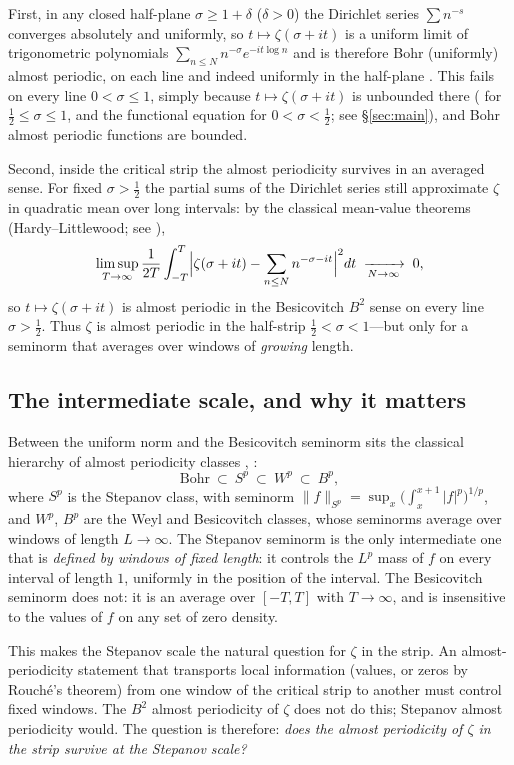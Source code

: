 \documentclass[11pt]{amsart}
\theoremstyle{definition}
\theoremstyle{remark}
\begin{document}
First, in any closed half-plane $\sigma\geq1+\delta$ ($\delta>0$) the
Dirichlet series $\sum n^{-s}$ converges absolutely and uniformly, so
$t\mapsto\zeta(\sigma+it)$ is a uniform limit of trigonometric
polynomials $\sum_{n\leq N}n^{-\sigma}e^{-it\log n}$ and is therefore
Bohr (uniformly) almost periodic, on each line and indeed uniformly in
the half-plane \cite{Bohr22,Besicovitch}. This fails on every line
$0<\sigma\leq1$, simply because $t\mapsto\zeta(\sigma+it)$ is unbounded
there (\cite[Ch.~VIII]{Titchmarsh} for $\tfrac12\le\sigma\le1$, and the functional
equation for $0<\sigma<\tfrac12$; see \S\ref{sec:main}), and Bohr
almost periodic functions are bounded.

Second, inside the critical strip the almost periodicity survives in
an averaged sense. For fixed $\sigma>\tfrac12$ the partial sums of the
Dirichlet series still approximate $\zeta$ in quadratic mean over long
intervals: by the classical mean-value theorems
(Hardy--Littlewood; see \cite[Ch.~VII]{Titchmarsh}),
\[
\limsup_{T\to\infty}\frac{1}{2T}\int_{-T}^{T}
\Bigl|\zeta(\sigma+it)-\sum_{n\leq N}n^{-\sigma-it}\Bigr|^2 dt
\;\xrightarrow[N\to\infty]{}\;0 ,
\]
so $t\mapsto\zeta(\sigma+it)$ is almost periodic in the Besicovitch
$B^2$ sense \cite[Ch.~II]{Besicovitch} on every line
$\sigma>\tfrac12$. Thus $\zeta$ is almost periodic in the half-strip $\tfrac12<\sigma<1$---but
only for a seminorm that averages over windows of \emph{growing}
length.

\subsection{The intermediate scale, and why it matters}
Between the uniform norm and the Besicovitch seminorm sits the
classical hierarchy of almost periodicity classes
\cite[Ch.~II]{Besicovitch}, \cite{LevitanZhikov}:
\[
\text{Bohr}\ \subset\ S^p\ \subset\ W^p\ \subset\ B^p ,
\]
where $S^p$ is the Stepanov class, with seminorm
$\|f\|_{S^p}=\sup_x\bigl(\int_x^{x+1}|f|^p\bigr)^{1/p}$, and $W^p$,
$B^p$ are the Weyl and Besicovitch classes, whose seminorms average
over windows of length $L\to\infty$. The Stepanov seminorm is the only
intermediate one that is \emph{defined by windows of fixed length}: it
controls the $L^p$ mass of $f$ on every interval of length $1$,
uniformly in the position of the interval. The Besicovitch seminorm
does not: it is an average over $[-T,T]$ with $T\to\infty$, and is
insensitive to the values of $f$ on any set of zero density.

This makes the Stepanov scale the natural question for $\zeta$ in the
strip. An almost-periodicity statement that transports local
information (values, or zeros by Rouch\'e's theorem) from one window
of the critical strip to another must control fixed windows. The $B^2$
almost periodicity of $\zeta$ does not do this; Stepanov almost
periodicity would. The question is therefore:
\emph{does the almost periodicity of $\zeta$ in the strip survive at
the Stepanov scale?}
\end{document}
